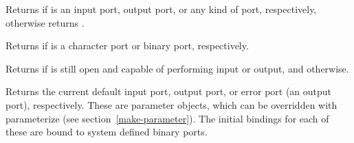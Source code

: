 \begin{entry}{%
}

Returns \schtrue{} if  is an input port, output port, or any
kind of port, respectively, otherwise returns \schfalse.


\end{entry}

\begin{entry}{%
}

Returns \schtrue{} if  is a character port or binary port,
respectively.
\end{entry}


\begin{entry}{%
}

Returns \schtrue{} if  is still open and capable of
performing input or output, and \schfalse{} otherwise.


\end{entry}


\begin{entry}{%
}

Returns the current default input port, output port, or error port (an
output port), respectively.  These are parameter objects, which can be
overridden with {\cf parameterize} (see
section~\ref{make-parameter}). The initial bindings for each of these
are bound to system defined binary ports.

\end{entry}


